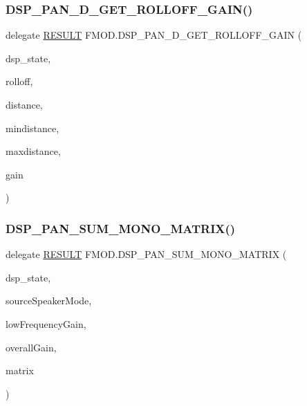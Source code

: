 \subsubsection{\texorpdfstring{D\+S\+P\+\_\+\+P\+A\+N\+\_\+D\+\_\+\+G\+E\+T\+\_\+\+R\+O\+L\+L\+O\+F\+F\+\_\+\+G\+A\+I\+N()}{DSP\_PAN\_3D\_GET\_ROLLOFF\_GAIN()}}
{\footnotesize\ttfamily delegate \hyperlink{namespace_f_m_o_d_a305d1176ef3f8c8815861a60407ac33d}{R\+E\+S\+U\+LT} F\+M\+O\+D.\+D\+S\+P\+\_\+\+P\+A\+N\+\_\+D\+\_\+\+G\+E\+T\+\_\+\+R\+O\+L\+L\+O\+F\+F\+\_\+\+G\+A\+IN (\begin{DoxyParamCaption}\item[{ref \hyperlink{struct_f_m_o_d_1_1_d_s_p___s_t_a_t_e}{D\+S\+P\+\_\+\+S\+T\+A\+TE}}]{dsp\+\_\+state,  }\item[{\hyperlink{namespace_f_m_o_d_aa8ce9494873e368660d4bf12f0330290}{D\+S\+P\+\_\+\+P\+A\+N\+\_\+3\+D\+\_\+\+R\+O\+L\+L\+O\+F\+F\+\_\+\+T\+Y\+PE}}]{rolloff,  }\item[{float}]{distance,  }\item[{float}]{mindistance,  }\item[{float}]{maxdistance,  }\item[{out float}]{gain }\end{DoxyParamCaption})}

\mbox{\label{namespace_f_m_o_d_af0cf7d431580d7f008accba401bd67be}} 
\subsubsection{\texorpdfstring{D\+S\+P\+\_\+\+P\+A\+N\+\_\+\+S\+U\+M\+\_\+\+M\+O\+N\+O\+\_\+\+M\+A\+T\+R\+I\+X()}{DSP\_PAN\_SUM\_MONO\_MATRIX()}}
{\footnotesize\ttfamily delegate \hyperlink{namespace_f_m_o_d_a305d1176ef3f8c8815861a60407ac33d}{R\+E\+S\+U\+LT} F\+M\+O\+D.\+D\+S\+P\+\_\+\+P\+A\+N\+\_\+\+S\+U\+M\+\_\+\+M\+O\+N\+O\+\_\+\+M\+A\+T\+R\+IX (\begin{DoxyParamCaption}\item[{ref \hyperlink{struct_f_m_o_d_1_1_d_s_p___s_t_a_t_e}{D\+S\+P\+\_\+\+S\+T\+A\+TE}}]{dsp\+\_\+state,  }\item[{int}]{source\+Speaker\+Mode,  }\item[{float}]{low\+Frequency\+Gain,  }\item[{float}]{overall\+Gain,  }\item[{Int\+Ptr}]{matrix }\end{DoxyParamCaption})}

